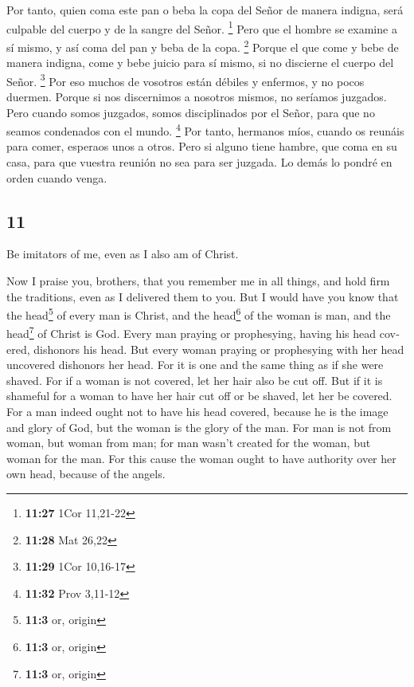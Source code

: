 \begin{paracol}{2}
 Por tanto, quien coma este pan o beba la copa del Señor
de manera indigna, será culpable del cuerpo y de la sangre del Señor.
\footnote{\textbf{11:27} 1Cor 11,21-22}  Pero que el
hombre se examine a sí mismo, y así coma del pan y beba de la copa.
\footnote{\textbf{11:28} Mat 26,22}  Porque el que come y
bebe de manera indigna, come y bebe juicio para sí mismo, si no
discierne el cuerpo del Señor. \footnote{\textbf{11:29} 1Cor 10,16-17}
 Por eso muchos de vosotros están débiles y enfermos, y
no pocos duermen.  Porque si nos discernimos a nosotros
mismos, no seríamos juzgados.  Pero cuando somos
juzgados, somos disciplinados por el Señor, para que no seamos
condenados con el mundo. \footnote{\textbf{11:32} Prov 3,11-12}
 Por tanto, hermanos míos, cuando os reunáis para comer,
esperaos unos a otros.  Pero si alguno tiene hambre, que
coma en su casa, para que vuestra reunión no sea para ser juzgada. Lo
demás lo pondré en orden cuando venga.

\switchcolumn
\begin{otherlanguage}{english}

\hypertarget{section-21}{%
\section{11}\label{section-21}}

 Be imitators of me, even as I also am of Christ.

 Now I praise you, brothers, that you remember me in all
things, and hold firm the traditions, even as I delivered them to you.
 But I would have you know that the head\footnote{\textbf{11:3}
  or, origin} of every man is Christ, and the head\footnote{\textbf{11:3}
  or, origin} of the woman is man, and the head\footnote{\textbf{11:3}
  or, origin} of Christ is God.  Every man praying or
prophesying, having his head covered, dishonors his head. 
But every woman praying or prophesying with her head uncovered dishonors
her head. For it is one and the same thing as if she were shaved.
 For if a woman is not covered, let her hair also be cut
off. But if it is shameful for a woman to have her hair cut off or be
shaved, let her be covered.  For a man indeed ought not to
have his head covered, because he is the image and glory of God, but the
woman is the glory of the man.  For man is not from woman,
but woman from man;  for man wasn't created for the woman,
but woman for the man.  For this cause the woman ought to
have authority over her own head, because of the angels.


\end{otherlanguage}
\end{paracol}
